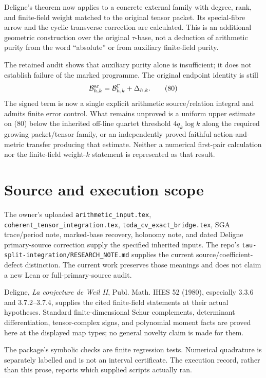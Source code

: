 \documentclass[11pt]{article}
\begin{document}
Deligne's theorem now applies to a concrete external family with degree, rank, and finite-field weight matched to the original tensor packet. Its special-fibre arrow and the cyclic transverse correction are calculated. This is an additional geometric construction over the original $\tau$-base, not a deduction of arithmetic purity from the word ``absolute'' or from auxiliary finite-field purity.

The retained audit shows that auxiliary purity alone is insufficient; it does not establish failure of the marked programme. The original endpoint identity is still
\[
 \mathcal B^{\rm ar}_{h,k}=\mathcal B^\Gamma_{h,k}+\Delta_{h,k}.
 \tag{80}
\]
The signed term is now a single explicit arithmetic source/relation integral and admits finite error control. What remains unproved is a uniform upper estimate on (80) below the inherited off-line quartet threshold $4q_k\log k$ along the required growing packet/tensor family, or an independently proved faithful action-and-metric transfer producing that estimate. Neither a numerical first-pair calculation nor the finite-field weight-$k$ statement is represented as that result.

\section*{Source and execution scope}
The owner's uploaded \texttt{arithmetic\_input.tex}, \texttt{coherent\_tensor\_integration.tex}, \texttt{toda\_cv\_exact\_bridge.tex}, SGA trace/period note, marked-base recovery, holonomy note, and dated Deligne primary-source correction supply the specified inherited inputs. The repo's \texttt{tau-split-integration/RESEARCH\_NOTE.md} supplies the current source/coefficient-defect distinction. The current work preserves those meanings and does not claim a new Lean or full-primary-source audit.

Deligne, \emph{La conjecture de Weil II}, Publ. Math. IHES 52 (1980), especially 3.3.6 and 3.7.2--3.7.4, supplies the cited finite-field statements at their actual hypotheses. Standard finite-dimensional Schur complements, determinant differentiation, tensor-complex signs, and polynomial moment facts are proved here at the displayed map types; no general novelty claim is made for them.

The package's symbolic checks are finite regression tests. Numerical quadrature is separately labelled and is not an interval certificate. The execution record, rather than this prose, reports which supplied scripts actually ran.
\end{document}
